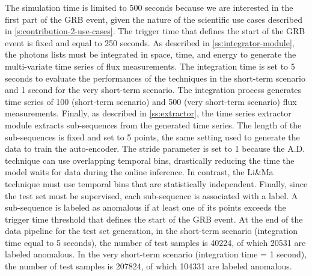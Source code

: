 The simulation time is limited to 500 seconds because we are interested in the first part of the GRB event, given the nature of the scientific use cases described in \autoref{s:contribution-2-use-cases}. The trigger time that defines the start of the GRB event is fixed and equal to 250 seconds. As described in \autoref{ss:integrator-module}, the photons lists must be integrated in space, time, and energy to generate the multi-variate time series of flux measurements. The integration time is set to 5 seconds to evaluate the performances of the techniques in the short-term scenario and 1 second for the very short-term scenario. The integration process generates time series of 100 (short-term scenario) and 500 (very short-term scenario) flux measurements. Finally, as described in \autoref{ss:extractor}, the time series extractor module extracts sub-sequences from the generated time series. The length of the sub-sequences is fixed and set to 5 points, the same setting used to generate the 
data to train the auto-encoder. The stride parameter is set to 1 because the A.D. technique can use overlapping temporal bins, drastically reducing the time the model waits for data during the online inference. In contrast, the Li\&Ma technique must use temporal bins that are statistically independent. Finally, since the test set must be supervised, each sub-sequence is associated with a label. A sub-sequence is labeled as anomalous if at least one of its points exceeds the trigger time threshold that defines the start of the GRB event. At the end of the data pipeline for the test set generation, in the short-term scenario (integration time equal to 5 seconds), the number of test samples is 40224, of which 20531 are labeled anomalous. In the very short-term scenario (integration time = 1 second), the number of test samples is 207824, of which 104331 are labeled anomalous.


